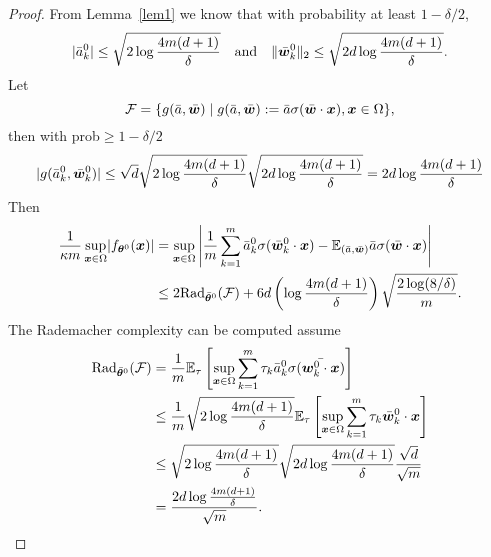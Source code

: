 \documentclass{article}
\begin{document}
\begin{proof}
    From Lemma~\ref{lem1} we know that with probability at least $1-\delta/2$,
    \begin{equation}
        \lvert\bar{a}_k^0\rvert \leq \sqrt{2\log\frac{4m(d+1)}{\delta}} \quad \text{and} \quad \lVert\bar{\bm{w}}_k^0\rVert_2 \leq \sqrt{2d\log\frac{4m(d+1)}{\delta}}.
    \end{equation}
    Let
    \begin{equation}
        \mathcal{F} = \{g(\bar{a},\bar{\bm{w}}) \mid g(\bar{a},\bar{\bm{w}}):=\bar{a}\sigma(\bar{\bm{w}}\cdot\bm{x}),\bm{x}\in\Omega \},
    \end{equation}
    then with prob$\geq 1-\delta/2$
    \begin{equation}
        \lvert g(\bar{a}^0_k,\bar{\bm{w}}^0_k)\rvert\leq\sqrt{d}\sqrt{2\log\frac{4m(d+1)}{\delta}}\sqrt{2d\log\frac{4m(d+1)}{\delta}}=2d\log\frac{4m(d+1)}{\delta}
    \end{equation}
    Then
    \begin{equation}
        \begin{aligned}
            \frac{1}{\kappa m}\sup_{\bm{x}\in\Omega}\lvert f_{\bm{\theta}^0}(\bm{x})\rvert
             & =\sup_{\bm{x}\in\Omega}\left\lvert \frac{1}{m}\sum_{k=1}^m \bar{a}_k^0\sigma(\bar{\bm{w}}_k^0\cdot\bm{x})-\mathbb{E}_{(\bar{a},\bar{\bm{w}})}\bar{a}\sigma(\bar{\bm{w}}\cdot\bm{x})\right\rvert \\
             & \leq 2\mathrm{Rad}_{\bar{\bm{\theta}}^0}(\mathcal{F}) + 6d \left(\log\frac{4m(d+1)}{\delta}\right)\sqrt{\frac{2\log(8/\delta)}{m}}.
        \end{aligned}
    \end{equation}
    The Rademacher complexity can be computed assume
    \begin{equation}
        \begin{aligned}
            \mathrm{Rad}_{\bar{\bm{\theta}}^0}(\mathcal{F})
             & =\frac{1}{m}\mathbb{E}_{\tau}\left[\sup_{\bm{x}\in\Omega}\sum_{k=1}^m\tau_k\bar{a}^0_k\sigma(\bar{\bm{w}^0_k\cdot\bm{x}})\right]                   \\
             & \leq\frac{1}{m}\sqrt{2\log\frac{4m(d+1)}{\delta}}\mathbb{E}_{\tau}\left[\sup_{\bm{x}\in\Omega}\sum_{k=1}^m\tau_k\bar{\bm{w}}^0_k\cdot\bm{x}\right] \\
             & \leq\sqrt{2\log\frac{4m(d+1)}{\delta}}\sqrt{2d\log\frac{4m(d+1)}{\delta}}\frac{\sqrt{d}}{\sqrt{m}}                                  \\
             & =\frac{2d\log\frac{4m(d+1)}{\delta}}{\sqrt{m}}.
        \end{aligned}
    \end{equation}

\end{proof}
\end{document}
